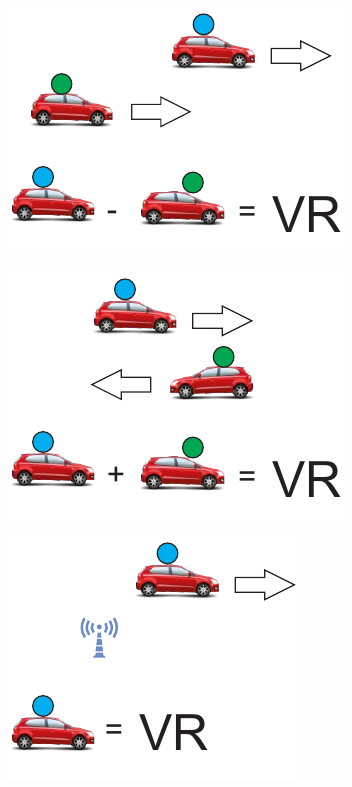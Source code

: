 \begin{figure}[htbp]
	\centering
	\begin{minipage}{0.46\textwidth}
		\centering
		\includegraphics[scale=0.5]{resultados/figuras/velocidadeRelativaNegativa.pdf}
		\label{fig:velocidadeRelativaNegativa}
	\end{minipage}
	\begin{minipage}{0.46\textwidth}
		\centering
		\includegraphics[scale=0.5]{resultados/figuras/velocidadeRelativaPositiva.pdf}
		\label{fig:velocidadeRelativaPositiva}
	\end{minipage}
	\begin{minipage}{0.46\textwidth}
		\centering
		\includegraphics[scale=0.5]{resultados/figuras/velocidadeRelativaNeutra.pdf}
		\label{fig:velocidadeRelativaNeutra}
	\end{minipage}
\end{figure}
